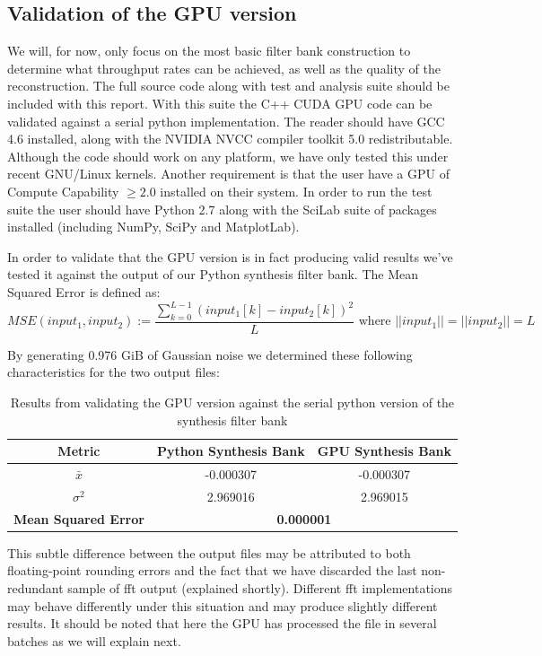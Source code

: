 \documentclass[a4paper,10pt]{article}
\begin{document}
\subsection{Validation of the GPU version}
We will, for now, only focus on the most basic filter bank construction to determine what throughput rates can be achieved, as well as the quality of the reconstruction. The full source code
along with test and analysis suite should be included with this report. With this suite the C++ CUDA GPU code can be validated against a serial python implementation. The reader 
should have GCC 4.6 installed, along with the NVIDIA NVCC compiler toolkit 5.0 redistributable. Although the code should work on any platform, we have only tested this under 
recent GNU/Linux kernels. Another requirement is that the user have a GPU of Compute Capability $\geq2.0$ installed on their system. In order to run the test suite the user should have 
Python 2.7 along with the SciLab suite of packages installed (including NumPy, SciPy and MatplotLab).

In order to validate that the GPU version is in fact producing valid results we've tested it against the output of our Python synthesis filter bank. The Mean Squared Error 
is defined as:
\begin{equation}
 MSE(input_1,input_2) := \frac{\sum_{k=0}^{L-1}{(input_1[k] - input_2[k])^2}}{L} \text{ where } ||input_1|| = ||input_2|| = L
\end{equation}

By generating 0.976 GiB of Gaussian noise we determined these following characteristics for the two output files:
\begin{table}
  \centering
  \begin{tabular}{|c|c|c|}
    \hline
    \textbf{Metric} & \textbf{Python Synthesis Bank} & \textbf{GPU Synthesis Bank} \\
    \hline
    $\bar x$ & -0.000307 & -0.000307 \\
    \hline
    $\sigma^{2}$ & 2.969016 & 2.969015 \\
    \hline
    \textbf{Mean Squared Error} & \multicolumn{2}{|c|}{\textbf{0.000001}} \\
    \hline
  \end{tabular}
  \caption[Validation of the GPU version]{Results from validating the GPU version against the serial python version of the synthesis filter bank}
\end{table}

This subtle difference between the output files may be attributed to both floating-point rounding errors and the fact that we have discarded the last non-redundant
sample of \gls{fft} output (explained shortly). Different \gls{fft} implementations may behave differently under this situation and may produce slightly different results. 
It should be noted that here the GPU has processed the file in several batches as we will explain next.
\end{document}
